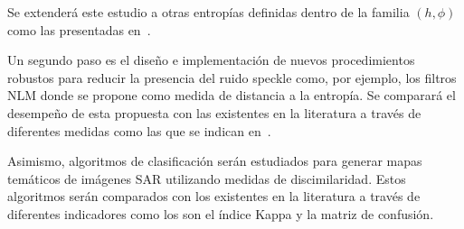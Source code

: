 \documentclass[11pt]{article}
\begin{document}
Se extenderá este estudio a otras entropías definidas dentro de la familia $(h,\phi)$ como las presentadas en~\cite{Frery2019}.

Un segundo paso es el diseño e implementación de nuevos procedimientos robustos para reducir la presencia del ruido speckle como, por ejemplo, los filtros NLM donde se propone como medida de distancia a la entropía. Se comparará el desempeño de esta propuesta con las existentes en la literatura a través de diferentes medidas como las que se indican en~\cite{Frery2019}.

Asimismo, algoritmos de clasificación serán estudiados para generar mapas temáticos de imágenes SAR utilizando medidas de discimilaridad. Estos algoritmos serán comparados con los existentes en la literatura a través de diferentes indicadores como los son el índice Kappa y la matriz de confusión.

%


\end{document}
